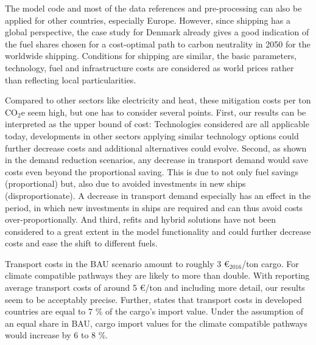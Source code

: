 \documentclass[article]{elsarticle}
\begin{document}
The model code and most of the data references and pre-processing can also be applied for other countries, especially Europe. However, since shipping has a global perspective, the case study for Denmark already gives a good indication of the fuel shares chosen for a cost-optimal path to carbon neutrality in 2050 for the worldwide shipping. Conditions for shipping are similar, the basic parameters, technology, fuel and infrastructure costs are considered as world prices rather than reflecting local particularities. %

Compared to other sectors like electricity and heat, these mitigation costs per ton CO$_2$e seem high, but one has to consider several points. First, our results can be interpreted as the upper bound of cost: Technologies considered are all applicable today, developments in other sectors applying similar technology options could further decrease costs and additional alternatives could evolve. Second, as shown in the demand reduction scenarios, any decrease in transport demand would save costs even beyond the proportional saving. This is due to not only fuel savings (proportional) but, also due to avoided investments in new ships (disproportionate). A decrease in transport demand especially has an effect in the period, in which new investments in ships are required and can thus avoid costs over-proportionally. And third, refits and hybrid solutions have not been considered to a great extent in the model functionality and could further decrease costs and ease the shift to different fuels.


Transport costs in the BAU scenario amount to roughly 3 \euro$_{2016}$/ton cargo. For climate compatible pathways they are likely to more than double. With \cite[p.~50]{UNCTAD2015} reporting average transport costs of around 5 \euro/ton and including more detail, our results seem to be acceptably precise. Further, \cite[p.~55]{UNCTAD2015} states that transport costs in developed countries are equal to 7 \% of the cargo's import value. Under the assumption of an equal share in BAU, cargo import values for the climate compatible pathways would increase by 6 to 8 \%.

\end{document}
